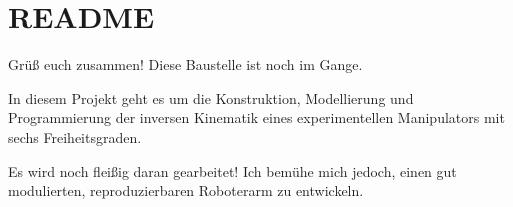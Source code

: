 \chapter{README }
\hypertarget{md__r_e_a_d_m_e}{}\label{md__r_e_a_d_m_e}
Grüß euch zusammen! Diese Baustelle ist noch im Gange.

In diesem Projekt geht es um die Konstruktion, Modellierung und Programmierung der inversen Kinematik eines experimentellen Manipulators mit sechs Freiheitsgraden.

Es wird noch fleißig daran gearbeitet! Ich bemühe mich jedoch, einen gut modulierten, reproduzierbaren Roboterarm zu entwickeln. 